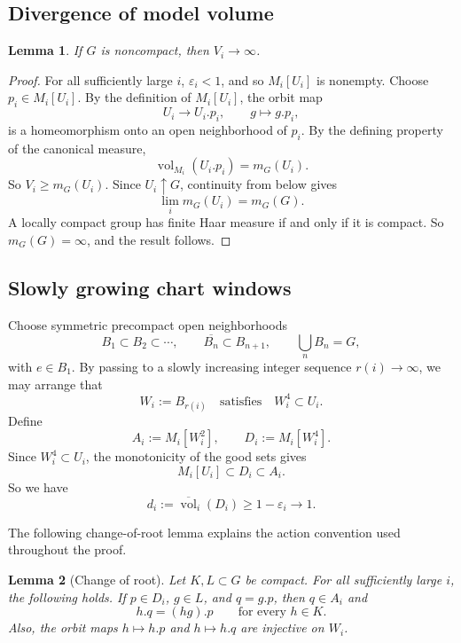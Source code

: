 \documentclass[12pt]{amsart}
\newtheorem{lemma}[lemma]{Lemma}
\theoremstyle{definition}
\newcommand{\Haar}{m_G}
\newcommand{\vol}{\operatorname{vol}}
\newcommand{\1}{\mathbf 1}
\newcommand{\eps}{\varepsilon}
\newcommand{\dbar}{\overline{\vol}}
\begin{document}
\subsection{Divergence of model volume}

\begin{lemma}\label{lem:volume-divergence}
If $G$ is noncompact, then $V_i\to\infty$.
\end{lemma}

\begin{proof}
For all sufficiently large $i$, $\eps_i<1$, and so $M_i[U_i]$ is nonempty. Choose $p_i\in M_i[U_i]$. By the definition of $M_i[U_i]$, the orbit map
\[
 U_i\longrightarrow U_i.p_i,\qquad g\longmapsto g.p_i,
\]
is a homeomorphism onto an open neighborhood of $p_i$. By the defining property of the canonical measure,
\[
 \vol_{M_i}(U_i.p_i)=\Haar(U_i).
\]
So $V_i\geq \Haar(U_i)$. Since $U_i\uparrow G$, continuity from below gives
\[
 \lim_i\Haar(U_i)=\Haar(G).
\]
A locally compact group has finite Haar measure if and only if it is compact. So $\Haar(G)=\infty$, and the result follows.
\end{proof}

\subsection{Slowly growing chart windows}

Choose symmetric precompact open neighborhoods
\[
 B_1\subset B_2\subset\cdots,\qquad \overline{B_n}\subset B_{n+1},\qquad \bigcup_nB_n=G,
\]
with $e\in B_1$. By passing to a slowly increasing integer sequence $r(i)\to\infty$, we may arrange that
\[
 W_i:=B_{r(i)}\quad\text{satisfies}\quad W_i^4\subset U_i.
\]
Define
\[
 A_i:=M_i[W_i^2],\qquad D_i:=M_i[W_i^4].
\]
Since $W_i^4\subset U_i$, the monotonicity of the good sets gives
\[
 M_i[U_i]\subset D_i\subset A_i.
\]
So we have
\begin{equation}\label{eq:deep-core-density}
 d_i:=\dbar_i(D_i)\geq1-\eps_i\longrightarrow1.
\end{equation}

The following change-of-root lemma explains the action convention used throughout the proof.

\begin{lemma}[Change of root]\label{lem:change-root}
Let $K,L\subset G$ be compact. For all sufficiently large $i$, the following holds. If $p\in D_i$, $g\in L$, and $q=g.p$, then $q\in A_i$ and
\[
 h.q=(hg).p\qquad\text{for every }h\in K.
\]
Also, the orbit maps $h\mapsto h.p$ and $h\mapsto h.q$ are injective on $W_i$.
\end{lemma}
\end{document}
